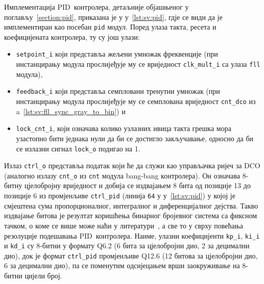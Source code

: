 \documentclass[master]{finthesis}
\newcommand*{\prog}[1]{\texttt{#1}}
\def \PID  {PID} %
\begin{document}
Имплементација \PID\ контролера, детаљније објашњеног у поглављу~\ref{section:pid}, приказана је у \lstlistingname{у}~\ref{lst:sv:pid}, гдје се види да је имплементиран као посебан \prog{pid} модул. Поред улаза такта, ресета и коефицијената контролера, ту су још улази:
\begin{itemize}
	\item \prog{setpoint\_i} који представља жељени умножак фреквенције (при инстанцирању модула прослијеђује му се вриједност \prog{clk\_mult\_i} са улаза \prog{fll} модула),
	\item \prog{feedback\_i} који представља семпловани тренутни умножак (при инстанцирању модула прослијеђује му се семплована вриједност \prog{cnt\_dco} из \lstlistingname{a}~\ref{lst:sv:fll_sync_gray_to_bin}) и
	\item \prog{lock\_cnt\_i}, који означава колико узлазних ивица такта грешка мора узастопно бити једнака нули да би се достигло закључавање, односно да би се излазни сигнал \prog{lock\_o} подигао на 1.
\end{itemize}
Излаз \prog{ctrl\_o} представља податак који ће да служи као управљачка ријеч за DCO (аналогно излазу \prog{cnt\_o} из \prog{cnt} модула bang-bang контролера). Он означава 8-битну цјелобројну вриједност и добија се издвајањем 8 бита од позиције 13 до позиције 6 из промјенљиве \prog{ctrl\_pid} (линија \prog{64} у \lstlistingname{у}~\ref{lst:sv:pid}) у којој је смјештена сума пропорционалног, интегралног и диференцијалног дејства. Такво издвајање битова је резултат коришћења бинарног бројевног система са фиксном тачком, о коме се више може наћи у литератури~\cite{Harris:DIGITAL_DESIGN_2012}, а све то у сврху повећања резолуције подешавања \PID\ контролера. Наиме, улазни коефицијенти \prog{kp\_i}, \prog{ki\_i} и \prog{kd\_i} су 8-битни у формату Q6.2 (6 бита за цјелобројни дио, 2 за децимални дио), док је формат \prog{ctrl\_pid} промјенљиве Q12.6 (12 битова за цјелобројни дио, 6 за децимални дио), па се поменутим одсијецањем врши заокруживање на 8-битни цијели број. \par
\end{document}

